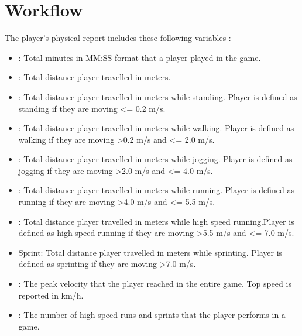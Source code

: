 \documentclass[letterpaper,10pt,english]{jupyterBook}
\begin{document}
\section{Workflow}
\label{\detokenize{Chap2/chap2:workflow}}
\sphinxAtStartPar
The player’s physical report includes these following variables :
\begin{itemize}
\item {} 
\sphinxAtStartPar
{}: Total minutes in MM:SS format that a player played in the game.

\item {} 
\sphinxAtStartPar
{}: Total distance player travelled in meters.

\item {} 
\sphinxAtStartPar
{}: Total distance player travelled in meters while standing. Player is deﬁned as standing if they are moving <= 0.2 m/s.

\item {} 
\sphinxAtStartPar
{}: Total distance player travelled in meters while walking. Player is deﬁned as walking if they are moving >0.2 m/s and <= 2.0 m/s.

\item {} 
\sphinxAtStartPar
{}: Total distance player travelled in meters while jogging. Player is deﬁned as jogging if they are moving >2.0 m/s and <= 4.0 m/s.

\item {} 
\sphinxAtStartPar
{}: Total distance player travelled in meters while running. Player is deﬁned as running if they are moving >4.0 m/s and <= 5.5 m/s.

\item {} 
\sphinxAtStartPar
{}: Total distance player travelled in meters while high speed running.Player is deﬁned as high speed running if they are moving >5.5 m/s and <= 7.0 m/s.

\item {} 
\sphinxAtStartPar
Sprint: Total distance player travelled in meters while sprinting. Player is deﬁned as sprinting if they are moving >7.0 m/s.

\item {} 
\sphinxAtStartPar
{}: The peak velocity that the player reached in the entire game. Top speed is reported in km/h.

\item {} 
\sphinxAtStartPar
{}: The number of high speed runs and sprints that the player performs in a game.

\end{itemize}
\end{document}
